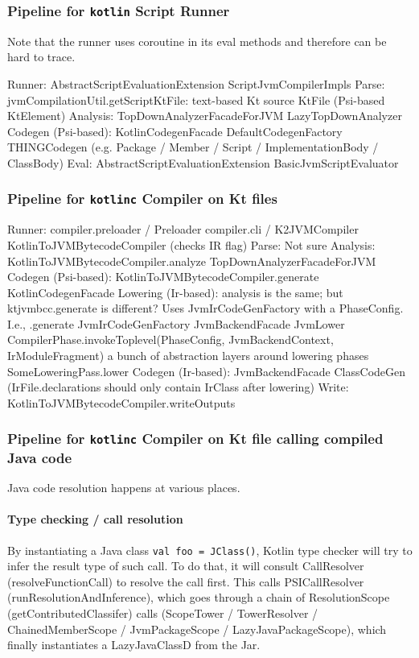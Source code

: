 \documentclass{article}
\begin{document}
\subsubsection{Pipeline for \texttt{kotlin} Script Runner}
Note that the runner uses coroutine in its eval methods and therefore can be hard to trace.

Runner: AbstractScriptEvaluationExtension \textSafeTo ScriptJvmCompilerImpls
Parse: jvmCompilationUtil.getScriptKtFile: text-based Kt source \textSafeTo KtFile (Psi-based KtElement)
Analysis: TopDownAnalyzerFacadeForJVM \textSafeTo LazyTopDownAnalyzer
Codegen (Psi-based): KotlinCodegenFacade \textSafeTo DefaultCodegenFactory \textSafeTo THINGCodegen (e.g. Package / Member / Script / ImplementationBody / ClassBody)
Eval: AbstractScriptEvaluationExtension \textSafeTo BasicJvmScriptEvaluator

\subsubsection{Pipeline for \texttt{kotlinc} Compiler on Kt files}

 Runner: compiler.preloader / Preloader \textSafeTo compiler.cli / K2JVMCompiler \textSafeTo KotlinToJVMBytecodeCompiler (checks IR flag)
Parse: Not sure
Analysis: KotlinToJVMBytecodeCompiler.analyze \textSafeTo TopDownAnalyzerFacadeForJVM
Codegen (Psi-based): KotlinToJVMBytecodeCompiler.generate \textSafeTo KotlinCodegenFacade
Lowering (Ir-based): analysis is the same; but ktjvmbcc.generate is different? Uses JvmIrCodeGenFactory with a PhaseConfig. I.e., .generate \textSafeTo JvmIrCodeGenFactory \textSafeTo JvmBackendFacade \textSafeTo JvmLower \textSafeTo CompilerPhase.invokeToplevel(PhaseConfig, JvmBackendContext, IrModuleFragment) \textSafeTo a bunch of abstraction layers around lowering phases \textSafeTo SomeLoweringPass.lower
Codegen (Ir-based): JvmBackendFacade \textSafeTo ClassCodeGen (IrFile.declarations should only contain IrClass after lowering)
Write: KotlinToJVMBytecodeCompiler.writeOutputs

\subsubsection{Pipeline for \texttt{kotlinc} Compiler on Kt file calling compiled Java code}

Java code resolution happens at various places.

\paragraph{Type checking / call resolution}
By instantiating a Java class \texttt{val foo = JClass()}, Kotlin type checker will try to infer the result type of such call. To do that, it will consult CallResolver (resolveFunctionCall) to resolve the call first. This calls PSICallResolver (runResolutionAndInference), which goes through a chain of ResolutionScope (getContributedClassifer) calls (ScopeTower / TowerResolver / ChainedMemberScope / JvmPackageScope / LazyJavaPackageScope), which finally instantiates a LazyJavaClassD from the Jar.
\end{document}

